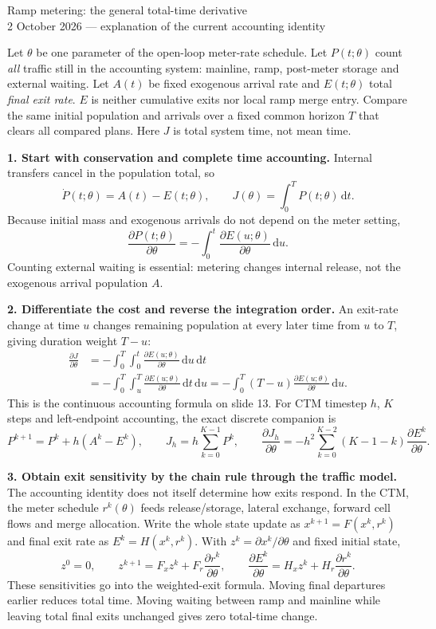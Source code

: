 \documentclass[11pt]{article}
\newcommand{\dd}{\,\mathrm{d}}
\begin{document}
\begin{center}
{\Large Ramp metering: the general total-time derivative}\\[0.3em]
2 October 2026 --- explanation of the current accounting identity
\end{center}

Let \(\theta\) be one parameter of the open-loop meter-rate schedule. Let
\(P(t;\theta)\) count \emph{all} traffic still in the accounting system:
mainline, ramp, post-meter storage and external waiting. Let \(A(t)\) be
fixed exogenous arrival rate and \(E(t;\theta)\) total \emph{final exit rate}.
\(E\) is neither cumulative exits nor local ramp merge entry. Compare the same
initial population and arrivals over a fixed common horizon \(T\) that clears
all compared plans. Here \(J\) is total system time, not mean time.

\textbf{1. Start with conservation and complete time accounting.}
Internal transfers cancel in the population total, so
\[
 \dot P(t;\theta)=A(t)-E(t;\theta),\qquad
 J(\theta)=\int_0^T P(t;\theta)\dd t.
\]
Because initial mass and exogenous arrivals do not depend on the meter setting,
\[
 \frac{\partial P(t;\theta)}{\partial\theta}
 =-\int_0^t\frac{\partial E(u;\theta)}{\partial\theta}\dd u.
\]
Counting external waiting is essential: metering changes internal release,
not the exogenous arrival population \(A\).

\textbf{2. Differentiate the cost and reverse the integration order.}
An exit-rate change at time \(u\) changes remaining population at every later
time from \(u\) to \(T\), giving duration weight \(T-u\):
\begin{align*}
 \frac{\partial J}{\partial\theta}
 &=-\int_0^T\int_0^t
       \frac{\partial E(u;\theta)}{\partial\theta}\dd u\dd t\\
 &=-\int_0^T\int_u^T
       \frac{\partial E(u;\theta)}{\partial\theta}\dd t\dd u
 =\boxed{-\int_0^T(T-u)
       \frac{\partial E(u;\theta)}{\partial\theta}\dd u.}
\end{align*}
This is the continuous accounting formula on slide 13. For CTM timestep
\(h\), \(K\) steps and left-endpoint accounting, the exact discrete companion is
\[
 P^{k+1}=P^k+h(A^k-E^k),\qquad J_h=h\sum_{k=0}^{K-1}P^k,
 \qquad
 \frac{\partial J_h}{\partial\theta}
 =-h^2\sum_{k=0}^{K-2}(K-1-k)\frac{\partial E^k}{\partial\theta}.
\]

\textbf{3. Obtain exit sensitivity by the chain rule through the traffic model.}
The accounting identity does not itself determine how exits respond. In the
CTM, the meter schedule \(r^k(\theta)\) feeds release/storage, lateral exchange,
forward cell flows and merge allocation. Write the whole state update as
\(x^{k+1}=F(x^k,r^k)\) and final exit rate as \(E^k=H(x^k,r^k)\).
With \(z^k=\partial x^k/\partial\theta\) and fixed initial state,
\[
 z^0=0,\qquad
 z^{k+1}=F_xz^k+F_r\frac{\partial r^k}{\partial\theta},\qquad
 \frac{\partial E^k}{\partial\theta}
 =H_xz^k+H_r\frac{\partial r^k}{\partial\theta}.
\]
These sensitivities go into the weighted-exit formula. Moving final departures
earlier reduces total time. Moving waiting between ramp and mainline while
leaving total final exits unchanged gives zero total-time change.
\end{document}
